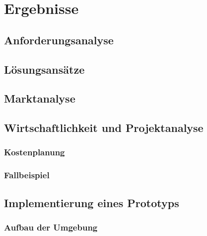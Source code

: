 \documentclass[a4paper, 12pt, oneside]{scrbook}
\begin{document}
\chapter{Ergebnisse}\label{ch:Ergebnisse}
	
	
	\section{Anforderungsanalyse}
	
	\section{Lösungsansätze}
		
	
	\section{Marktanalyse}
	
	
	\section{Wirtschaftlichkeit und Projektanalyse}
	
		\subsection{Kostenplanung}
		
		\subsection{Fallbeispiel}
	
	\section{Implementierung eines Prototyps}
	
		\subsection{Aufbau der Umgebung}
		
\end{document}

